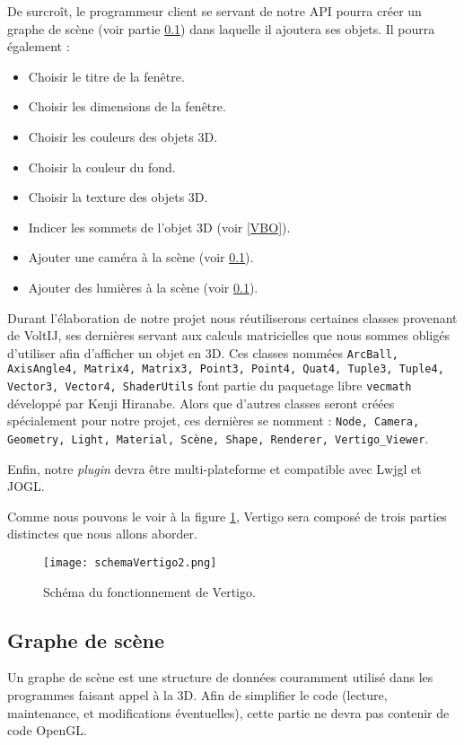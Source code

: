 \documentclass[11pt]{report}
\begin{document}
De surcroît, le programmeur client se servant de notre API pourra créer un graphe de scène (voir partie \ref{gScene}) dans laquelle il ajoutera ses objets. 
Il pourra également :
\begin{itemize}
\item Choisir le titre de la fenêtre.
\item Choisir les dimensions de la fenêtre.
\item Choisir les couleurs des objets 3D.
\item Choisir la couleur du fond.
\item Choisir la texture des objets 3D.
\item Indicer les sommets de l'objet 3D (voir \ref{VBO}).
\item Ajouter une caméra à la scène (voir \ref{gScene}).
\item Ajouter des lumières à la scène (voir \ref{gScene}).
\end{itemize}

Durant l'élaboration de notre projet nous réutiliserons certaines classes provenant de VoltIJ, ses dernières servant aux calculs matricielles que nous sommes obligés d'utiliser afin d'afficher un objet en 3D. Ces classes nommées \texttt{ArcBall, AxisAngle4, Matrix4, Matrix3, Point3, Point4, Quat4, Tuple3, Tuple4, Vector3, Vector4, ShaderUtils}
font partie du paquetage libre \texttt{vecmath} développé par Kenji Hiranabe.
Alors que d'autres classes seront créées spécialement pour notre projet, ces dernières se nomment : \texttt{Node, Camera, Geometry, Light, Material, Scène, Shape, Renderer, Vertigo\_Viewer}.

Enfin, notre \textit{plugin} devra être multi-plateforme et compatible avec Lwjgl et JOGL.

Comme nous pouvons le voir à la figure \ref{schemaVertigo}, Vertigo sera composé de trois parties distinctes que nous allons aborder.

\begin{figure}[h!]
  \caption{Schéma du fonctionnement de Vertigo.}
  \centering
  \label{schemaVertigo}
    \texttt{[image: schemaVertigo2.png]}
\end{figure}
 
 
 
\subsection{Graphe de scène} \label{gScene}
Un graphe de scène est une structure de données couramment utilisé dans les programmes faisant appel à la 3D.
Afin de simplifier le code (lecture, maintenance, et modifications éventuelles), cette partie ne devra pas contenir de code OpenGL.\\
\end{document}
